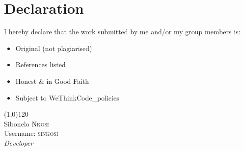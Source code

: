 \section*{Declaration}

I hereby declare that the work submitted by me and/or my group members is:
\begin{itemize}
    \item Original (not plagiarised)
    \item References listed
    \item Honest \& in Good Faith
    \item Subject to WeThinkCode\_policies
\end{itemize}

\vspace{15mm}


\begin{flushleft}
\line(1,0){120}\\
Sibonelo \textsc{Nkosi}\\ %
Username: \textsc{sinkosi}\\ %
{\large\textit{Developer}}
\end{flushleft}